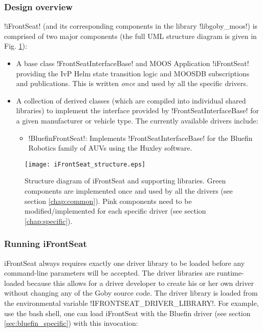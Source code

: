 \subsubsection{Design overview}

!iFrontSeat! (and its corresponding components in the library !libgoby_moos!) is comprised of two major components (the full UML structure diagram is given in Fig. \ref{fig:structure}):
\begin{itemize}
\item A base class !FrontSeatInterfaceBase! and MOOS Application !iFrontSeat! providing the IvP Helm state transition logic and MOOSDB subscriptions and publications. This is written \textit{once} and used by all the specific drivers. 
\item A collection of derived classes (which are compiled into individual shared libraries) to implement the interface provided by !FrontSeatInterfaceBase! for a given manufacturer or vehicle type. The currently available drivers include:
\begin{itemize}
\item !BluefinFrontSeat!: Implements !FrontSeatInterfaceBase! for the Bluefin Robotics family of AUVs using the Huxley software.
\end{itemize}
\end{itemize}

\begin{figure}
\centering
\texttt{[image: iFrontSeat\_structure.eps]}
\caption{Structure diagram of iFrontSeat and supporting libraries. Green components are implemented once and used by all the drivers (see section \ref{chap:common}). Pink components need to be modified/implemented for each specific driver (see section \ref{chap:specific}).}
\label{fig:structure}
\end{figure}

\subsubsection{Running iFrontSeat}

iFrontSeat always requires exactly one driver library to be loaded before any command-line parameters will be accepted. The driver libraries are runtime-loaded because this allows for a driver developer to create his or her own driver without changing any of the Goby source code. The driver library is loaded from the environmental variable !IFRONTSEAT_DRIVER_LIBRARY!. For example, use the bash shell, one can load iFrontSeat with the Bluefin driver (see section \ref{sec:bluefin_specific}) with this invocation:

